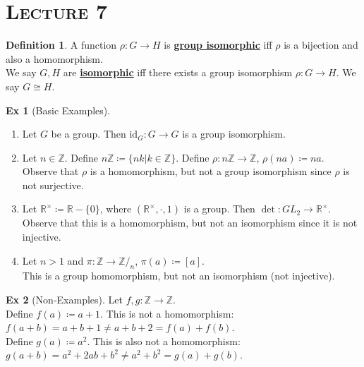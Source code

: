 \documentclass{article}
\newcommand{\Z}{\ensuremath{\mathbb{Z}}}
\newcommand{\R}{\ensuremath{\mathbb{R}}}
\newcommand{\coleq}{\ensuremath{\coloneqq}}
\newcommand{\define}[1]{\textbf{\underline{#1}}}
\newcommand{\func}[3]{\ensuremath{#1: #2 \to #3}}
\newcommand{\id}{\ensuremath{\mathrm{id}}}
\theoremstyle{definition}
\newtheorem*{defn}{Definition}
\newtheorem*{ex}{Ex}
\theoremstyle{remark}
\begin{document}
    \noindent\section*{\textbf{\textsc{Lecture 7}}}{
        \begin{defn}
            A function $\func{\rho}{G}{H}$ is \define{group isomorphic} iff $\rho$ is a bijection and also a homomorphism.\\
            We say $G,H$ are \define{isomorphic} iff there exists a group isomorphism $\func{\rho}{G}{H}$. We say $G \cong H$.
        \end{defn}
        
        \begin{ex}[Basic Examples]\hfill
            \begin{enumerate}
                \item Let $G$ be a group. Then $\func{\id_G}{G}{G}$ is a group isomorphism.
                \item Let $n \in \Z$. Define $n\Z \coleq \{nk|k \in \Z\}$. Define $\func{\rho}{n\Z}{\Z}$, $\rho(na) \coleq na$.\\
                Observe that $\rho$ is a homomorphism, but not a group isomorphism since $\rho$ is not surjective.
                \item Let $\R^\times \coleq \R-\{0\}$, where $(\R^\times,\cdot, 1)$ is a group. Then $\func{\det}{GL_2}{\R^\times}$.\\
                Observe that this is a homomorphism, but not an isomorphism since it is not injective.
                \item Let $n>1$ and $\func{\pi}{\Z}{\Z/_n}$, $\pi(a) \coleq [a]$.\\
                This is a group homomorphism, but not an isomorphism (not injective).
            \end{enumerate}
        \end{ex}
        
        \begin{ex}[Non-Examples]
            Let $\func{f,g}{\Z}{\Z}$.\\
            Define $f(a) \coleq a+1$. This is not a homomorphism: $f(a+b)=a+b+1\neq a+b+2=f(a)+f(b)$.\\
            Define $g(a) \coleq a^2$. This is also not a homomorphism: $g(a+b)=a^2+2ab+b^2\neq a^2+b^2=g(a)+g(b)$.
        \end{ex}
        
}
\end{document}
